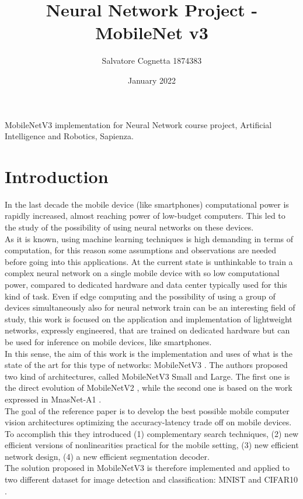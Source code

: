 \documentclass[12pt, letterpaper, twoside]{article}
\title{Neural Network Project - MobileNet v3}
\author{Salvatore Cognetta 1874383}
\date{January 2022}
\begin{document}
\begin{titlepage}
\maketitle
\end{titlepage}

\clearpage
\thispagestyle{empty}
\vspace*{\fill}
MobileNetV3 implementation for Neural Network course project, Artificial Intelligence and Robotics, Sapienza.
\vspace*{\fill}
\clearpage


\tableofcontents

\clearpage
    
\clearpage
\section{Introduction}
In the last decade the mobile device (like smartphones) computational power is rapidly increased, almost reaching power of low-budget computers. This led to the study of the possibility of using neural networks on these devices.\\
As it is known, using machine learning techniques is high demanding in terms of computation, for this reason some assumptions and observations are needed before going into this applications. At the current state is unthinkable to train a complex neural network on a single mobile device with so low computational power, compared to dedicated hardware and data center typically used for this kind of task. Even if edge computing and the possibility of using a group of devices simultaneously also for neural network train can be an interesting field of study, this work is focused on the application and implementation of lightweight networks, expressly engineered, that are trained on dedicated hardware but can be used for inference on mobile devices, like smartphones.\\

In this sense, the aim of this work is the implementation and uses of what is the state of the art for this type of networks: MobileNetV3 \cite{howard2019searching}. The authors proposed two kind of architectures, called MobileNetV3 Small and Large. The first one is the direct evolution of MobileNetV2 \cite{sandler2019mobilenetv2}, while the second one is based on the work expressed in MnasNet-A1 \cite{tan2019mnasnet}. \\

The goal of the reference paper is to develop the best possible mobile computer vision architectures optimizing the accuracy-latency trade off on mobile devices. To accomplish this they introduced (1) complementary search techniques, (2) new efficient versions of nonlinearities practical for the mobile setting, (3) new efficient network design, (4) a new efficient segmentation decoder.\\
The solution proposed in MobileNetV3 is therefore implemented and applied to two different dataset for image detection and classification: MNIST \cite{deng2012mnist} and CIFAR10 \cite{Krizhevsky09learningmultiple}.
\end{document}
